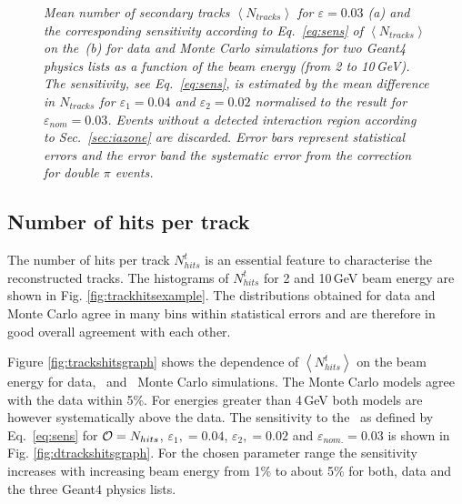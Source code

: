 \begin{figure}[H]
\begin{subfigure}{0.5\textwidth}
		\caption{\label{fig:dtracksgraph}}
	\end{subfigure}
	\caption{\label{fig:fulltrackgraph} \sl Mean number of secondary tracks $\left<N_{tracks}\right>$ for $\varepsilon = 0.03$ (a) and the corresponding sensitivity according to Eq.~\ref{eq:sens} of $\left<N_{tracks}\right>$ on the \ep\,(b) for data and Monte Carlo simulations for two {\sc Geant}4 physics lists as a function of the beam energy (from 2 to 10\,GeV). The sensitivity, see Eq.~\ref{eq:sens}, is estimated by the mean difference in $N_{tracks}$ for $\varepsilon_1 = 0.04$ and $\varepsilon_2 = 0.02$ normalised to the result for $\varepsilon_{nom} = 0.03$. Events without a detected interaction region according to Sec.~\ref{sec:iazone} are discarded. Error bars represent statistical errors and the error band the systematic error from the correction for double $\pi$ events.}
\end{figure}



\subsection{Number of hits per track}
The number of hits per track $N_{hits}^t$ is an essential feature to characterise the reconstructed tracks. 
The histograms of $N_{hits}^t$ for 2 and 10\,GeV beam energy are shown in Fig. \ref{fig:trackhitsexample}.
The distributions obtained for data and Monte Carlo agree in many bins within statistical errors and are therefore in good overall agreement with each other. 

Figure \ref{fig:trackshitsgraph} shows the dependence of $\left<N_{hits}^t\right>$ on the beam energy for data, \ftfp\ and \qgsp\ Monte Carlo simulations. The Monte Carlo models agree with the data within 5\%.  For energies greater than 4\,GeV both models are however systematically above  the data.
The sensitivity to the \ep\  as defined by Eq.~\ref{eq:sens} for ${\cal O}=N_{hits}$, $\varepsilon_{1},=0.04$, $\varepsilon_{2},=0.02$ and $\varepsilon_{nom.}=0.03$ is shown in Fig. \ref{fig:dtrackshitsgraph}. For the chosen parameter range the sensitivity increases with increasing beam energy from 1\% to about 5\% for both, data and the three {\sc Geant4} physics lists. 

